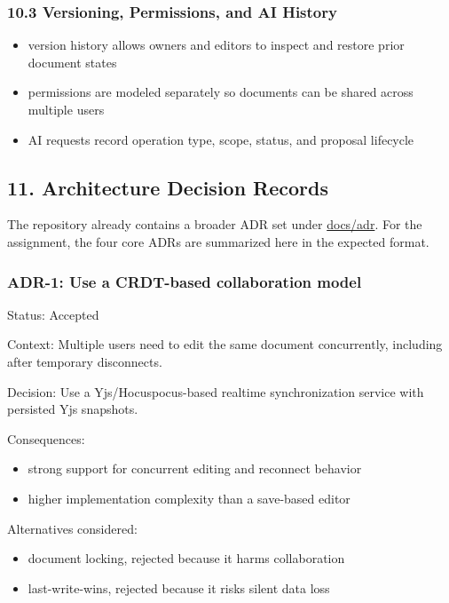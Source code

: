 \documentclass[a4paper]{article}
\providecommand{\tightlist}{%
  \setlength{\itemsep}{0pt}\setlength{\parskip}{0pt}}
\begin{document}
\subsubsection{10.3 Versioning, Permissions, and AI
History}\label{103-versioning-permissions-and-ai-history}

\begin{itemize}
\tightlist
\item
  version history allows owners and editors to inspect and restore prior
  document states
\item
  permissions are modeled separately so documents can be shared across
  multiple users
\item
  AI requests record operation type, scope, status, and proposal
  lifecycle
\end{itemize}

\subsection{11. Architecture Decision
Records}\label{11-architecture-decision-records}

The repository already contains a broader ADR set under
\href{/Users/rayan.banerjee/courses/software\%20project/docs/adr}{docs/adr}.
For the assignment, the four core ADRs are summarized here in the
expected format.

\subsubsection{ADR-1: Use a CRDT-based collaboration
model}\label{adr-1-use-a-crdt-based-collaboration-model}

Status: Accepted

Context: Multiple users need to edit the same document concurrently,
including after temporary disconnects.

Decision: Use a Yjs/Hocuspocus-based realtime synchronization service
with persisted Yjs snapshots.

Consequences:

\begin{itemize}
\tightlist
\item
  strong support for concurrent editing and reconnect behavior
\item
  higher implementation complexity than a save-based editor
\end{itemize}

Alternatives considered:

\begin{itemize}
\tightlist
\item
  document locking, rejected because it harms collaboration
\item
  last-write-wins, rejected because it risks silent data loss
\end{itemize}
\end{document}
